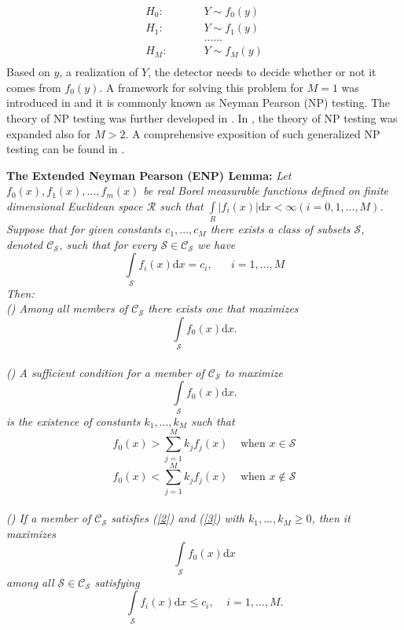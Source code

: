 \documentclass[12pt,journal,a4paper,twoside,onecolumn,draft]{IEEEtran}
\newcommand{\rmnum}[1]{\romannumeral #1}
\begin{document}
\begin{spacing}{2.5}
  \begin{equation}
\label{equ:hypothesis}
\begin{split}
H_0:\;\;\;\;\;\;\;\;\;&Y \sim f_0(y) \\
H_1:\;\;\;\;\;\;\;\;\;&Y \sim f_1(y)\\
&......\\
H_M:\;\;\;\;\;\;\;\;\;&Y \sim f_M(y)\\
\end{split}
\end{equation}
Based on $y$, a realization of $Y$, the detector needs to decide whether or not it comes from $f_0(y)$. A framework for solving this problem for $M=1$ was introduced in \cite{neyman1933problem} and it is commonly known as Neyman Pearson (NP) testing. The theory of NP testing was further developed in \cite{wald1939contributions}. In \cite{dantzig1951fundamental}, the theory of NP testing was  expanded also for $M>2$. A comprehensive exposition of such generalized NP testing can be found in \cite{LehmannTest}.

\noindent  \textbf{The Extended Neyman Pearson (ENP) Lemma:}
\textit{
Let $f_0(x), f_1(x), ..., f_{m}(x)$ be real Borel measurable functions  defined on finite dimensional  Euclidean space $\mathcal{R}$ such that $\int \limits_R | f_i(x)|\mathrm{d}x < \infty (i=0, 1,...,M)$.  Suppose that for given constants $c_1,...,c_M$ there exists a class of subsets $\mathcal{S}$, denoted $\mathcal{C}_\mathcal{S}$, such that for every $\mathcal{S} \in \mathcal{C}_\mathcal{S}$ we have
\begin{equation}
\label{one}
\int\limits_\mathcal{S} f_i(x)\mathrm{d}x = c_i, \;\;\;\;\;\;i=1,...,M
\end{equation}
Then:
\\\textnormal{(\rmnum{1})} Among all members of $\mathcal{C}_\mathcal{S}$ there exists one that maximizes
\[
\int \limits_\mathcal{S} f_{0}(x)\mathrm{d}x.
\]
\\\textnormal{(\rmnum{2})} A sufficient condition for a member of $\mathcal{C}_\mathcal{S}$ to maximize
\[
\int \limits_\mathcal{S} f_{0}(x)\mathrm{d}x.
\]
is the existence of constants $k_1,...,k_M$ such that
\begin{equation}
\label{2}
f_{0}(x)>\sum\limits_{j=1}^M k_j f_j(x)\;\;\;\;\text{when $x \in \mathcal{S}$}
\end{equation}
\begin{equation}
\label{3}
f_{0}(x)<\sum\limits_{j=1}^M k_j f_j(x)\;\;\;\;\text{when $x \notin \mathcal{S}$}
\end{equation}
\\\textnormal{(\rmnum{3})} If a member of $\mathcal{C}_\mathcal{S}$ satisfies  \textnormal{(\ref{2})} and \textnormal{(\ref{3})} with $k_1,...,k_M\geq0$, then it maximizes
\begin{equation}
\label{4}
\int \limits_\mathcal{S} f_{0}(x)\mathrm{d}x
\end{equation}
among all $\mathcal{S} \in \mathcal{C}_{\mathcal{S}}$ satisfying
\begin{equation}
\label{5}
\int \limits_\mathcal{S} f_i(x)\mathrm{d}x\leq c_i,\;\;\;\;i=1,...,M.
\end{equation}
}


\end{spacing}
\end{document}
